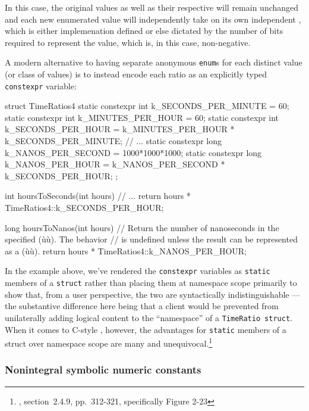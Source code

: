 \noindent In this case, the original values as well as their respective  will
remain unchanged and each new enumerated value will independently take
on its own independent , which is either implemenation defined or else
dictated by the number of bits required to represent the value, which
is, in this case, non-negative.

A modern alternative to having separate anonymous \lstinline!enum!s for
each distinct value (or class of values) is to instead encode each ratio
as an explicitly typed \lstinline!constexpr! variable:

\begin{emcppslisting}
struct TimeRatios4
{
    static constexpr int k_SECONDS_PER_MINUTE = 60;
    static constexpr int k_MINUTES_PER_HOUR   = 60;
    static constexpr int k_SECONDS_PER_HOUR   = k_MINUTES_PER_HOUR *
                                                k_SECONDS_PER_MINUTE;
    // ...
    static constexpr long k_NANOS_PER_SECOND  = 1000*1000*1000;
    static constexpr long k_NANOS_PER_HOUR    = k_NANOS_PER_SECOND *
                                                k_SECONDS_PER_HOUR;
};

int hoursToSeconds(int hours)
    // ...
{
    return hours * TimeRatios4::k_SECONDS_PER_HOUR;
}

long hoursToNanos(int hours)
    // Return the number of nanoseconds in the specified (ù{}ù).  The behavior
    // is undefined unless the result can be represented as a (ù{}ù).
{
    return hours * TimeRatios4::k_NANOS_PER_HOUR;
}
\end{emcppslisting}
    
\noindent In the example above, we've rendered the \lstinline!constexpr! variables as
\lstinline!static! members of a \lstinline!struct! rather than placing them at
namespace scope primarily to show that, from a user perspective, the two
are syntactically indistinguishable --- the substantive difference here
being that a client would be prevented from unilaterally adding logical
content to the ``namespace'' of a \lstinline!TimeRatio!~\lstinline!struct!.
When it comes to C-style , however, the
advantages for \lstinline!static! members of a struct over namespace scope
are many and \mbox{unequivocal}.{\cprotect\footnote{\cite{lakos20}, section~2.4.9, pp.~312-321, specifically Figure 2-23}}

\subsubsection[Nonintegral symbolic numeric constants]{Nonintegral symbolic numeric constants}\label{non-integral-symbolic-numeric-constants}

